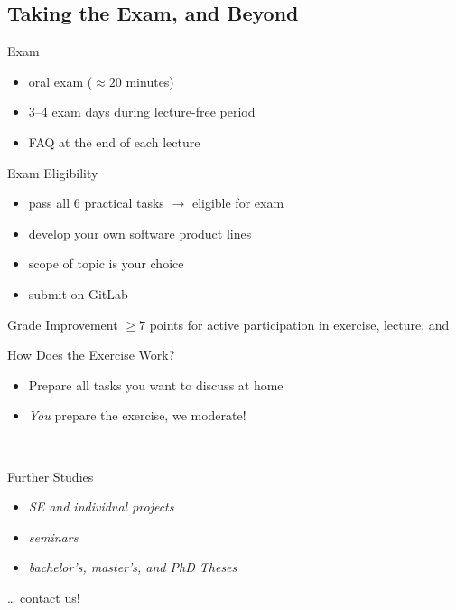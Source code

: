 


\subsection{Taking the Exam, and Beyond}

\begin{frame}{\myframetitle}
	\begin{mycolumns}
		\begin{definition}{Exam}
			\begin{itemize}
				\item oral exam ($\approx 20$ minutes)
				\item 3--4 exam days during lecture-free period
				\item FAQ at the end of each lecture
			\end{itemize}
		\end{definition}
		\begin{definition}{Exam Eligibility }
			\begin{itemize}
				\item pass all 6 practical tasks $\rightarrow$ eligible for exam
				\item develop your own software product lines
				\item scope of topic is your choice
				\item submit on GitLab
			\end{itemize}
		\end{definition}
		\begin{definition}{Grade Improvement }
			$\geq 7$ points for active participation in exercise, lecture, and \ulmMoodle
		\end{definition}
	\mynextcolumn
		\begin{note}{How Does the Exercise Work?}
			\begin{itemize}
				\item Prepare all tasks you want to discuss at home
				\item \emph{You} prepare the exercise, we moderate!
			\end{itemize}
		\end{note}

		~

		\begin{note}{Further Studies}
			\begin{itemize}
				\item \emph{SE and individual projects}
				\item \emph{seminars}
				\item \emph{bachelor's, master's, and PhD Theses}
			\end{itemize}
			\ldots{} contact us!
		\end{note}
	\end{mycolumns}
\end{frame}
